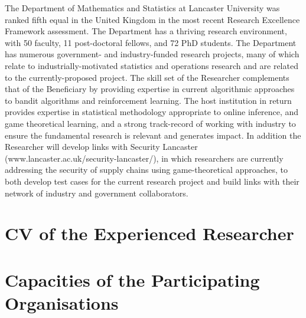 \documentclass[a4paper,11pt]{article}
\begin{document}
The Department of Mathematics and Statistics at Lancaster University was ranked fifth equal in the United Kingdom in the most recent Research Excellence Framework assessment.  The Department has a thriving research environment, with 50 faculty, 11 post-doctoral fellows, and 72 PhD students.  The Department has numerous government- and industry-funded research projects, many of which relate to industrially-motivated statistics and operations research and are related to the currently-proposed project.  The skill set of the Researcher complements that of the Beneficiary by providing expertise in current algorithmic approaches to bandit algorithms and reinforcement learning.  The host institution in return provides expertise in statistical methodology appropriate to online inference, and game theoretical learning, and a strong track-record of working with industry to ensure the fundamental research is relevant and generates impact.  In addition the Researcher will develop links with Security Lancaster (www.lancaster.ac.uk/security-lancaster/), in which researchers are currently addressing the security of supply chains using game-theoretical approaches, to both develop test cases for the current research project and build links with their network of industry and government collaborators.

\newpage
\section{CV of the Experienced Researcher}
\label{sec:cv}



\newpage
\section{Capacities of the Participating Organisations}
\label{sec:capacities}

\vspace{\baselineskip}
\end{document}
